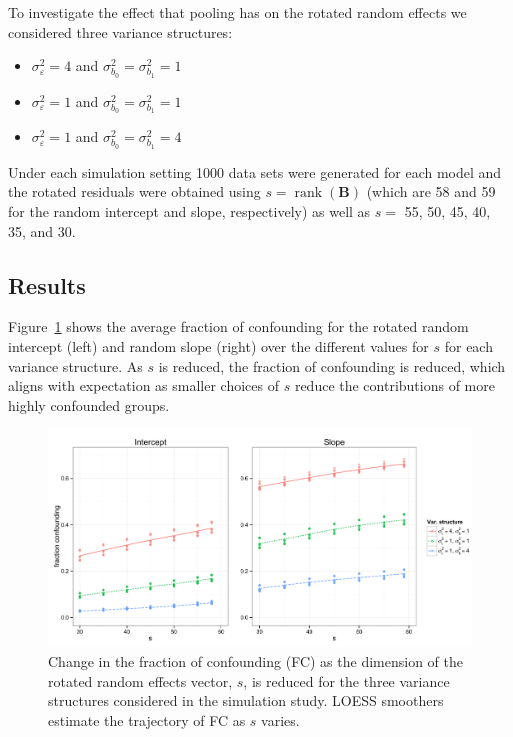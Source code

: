 \documentclass[12pt]{article} %
\DeclareMathOperator{\rank}{rank}
\begin{document}
To investigate the effect that pooling has on the rotated random effects we considered  three variance structures:
%
\begin{itemize}
\item $\sigma^2_\varepsilon = 4$ and  $\sigma^2_{b_0} = \sigma^2_{b_1} = 1$
\item $\sigma^2_\varepsilon = 1$ and  $\sigma^2_{b_0} = \sigma^2_{b_1} = 1$
\item $\sigma^2_\varepsilon = 1$ and  $\sigma^2_{b_0} = \sigma^2_{b_1} = 4$

\end{itemize}
%

Under each simulation setting 1000 data sets were generated for each model and the rotated residuals were obtained using $s = \rank(\bm{B})$ (which are 58 and 59 for the random intercept and slope, respectively) as well as $s =$ 55, 50, 45, 40, 35, and 30.


\subsection{Results}\label{sec:sim-results}

Figure~\ref{fig:fc} shows the average fraction of confounding for the rotated random intercept (left) and random slope (right) over the different values for $s$ for each variance structure. As $s$ is reduced, the fraction of confounding is reduced, which aligns with expectation as smaller choices of $s$ reduce the contributions of more highly confounded groups.

\begin{figure}[h]
	\centering
	\includegraphics[width=\textwidth]{fc_by_s.pdf}
	\caption{\label{fig:fc} Change in the fraction of confounding (FC) as the dimension of the rotated random effects vector, $s$, is reduced for the three variance structures considered in the simulation study. LOESS smoothers estimate the trajectory of FC as $s$ varies.}
\end{figure}
\end{document}
